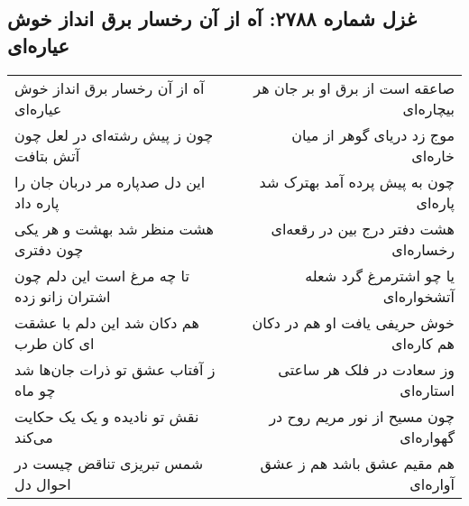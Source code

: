 \begin{center}
\section*{غزل شماره ۲۷۸۸: آه از آن رخسار برق انداز خوش عیاره‌ای}
\label{sec:2788}
\begin{longtable}{l p{0.5cm} r}
آه از آن رخسار برق انداز خوش عیاره‌ای
&&
صاعقه است از برق او بر جان هر بیچاره‌ای
\\
چون ز پیش رشته‌ای در لعل چون آتش بتافت
&&
موج زد دریای گوهر از میان خاره‌ای
\\
این دل صدپاره مر دربان جان را پاره داد
&&
چون به پیش پرده آمد بهترک شد پاره‌ای
\\
هشت منظر شد بهشت و هر یکی چون دفتری
&&
هشت دفتر درج بین در رقعه‌ای رخساره‌ای
\\
تا چه مرغ است این دلم چون اشتران زانو زده
&&
یا چو اشترمرغ گرد شعله آتشخواره‌ای
\\
هم دکان شد این دلم با عشقت ای کان طرب
&&
خوش حریفی یافت او هم در دکان هم کاره‌ای
\\
ز آفتاب عشق تو ذرات جان‌ها شد چو ماه
&&
وز سعادت در فلک هر ساعتی استاره‌ای
\\
نقش تو نادیده و یک یک حکایت می‌کند
&&
چون مسیح از نور مریم روح در گهواره‌ای
\\
شمس تبریزی تناقض چیست در احوال دل
&&
هم مقیم عشق باشد هم ز عشق آواره‌ای
\\
\end{longtable}
\end{center}
